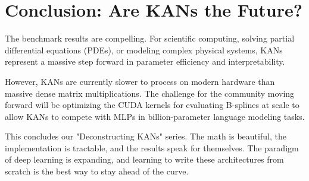 \documentclass[12pt]{article}
\begin{document}
\section*{Conclusion: Are KANs the Future?}
The benchmark results are compelling. For scientific computing, solving partial differential equations (PDEs), or modeling complex physical systems, KANs represent a massive step forward in parameter efficiency and interpretability.

However, KANs are currently slower to process on modern hardware than massive dense matrix multiplications. The challenge for the community moving forward will be optimizing the CUDA kernels for evaluating B-splines at scale to allow KANs to compete with MLPs in billion-parameter language modeling tasks.

This concludes our "Deconstructing KANs" series. The math is beautiful, the implementation is tractable, and the results speak for themselves. The paradigm of deep learning is expanding, and learning to write these architectures from scratch is the best way to stay ahead of the curve.
\end{document}

